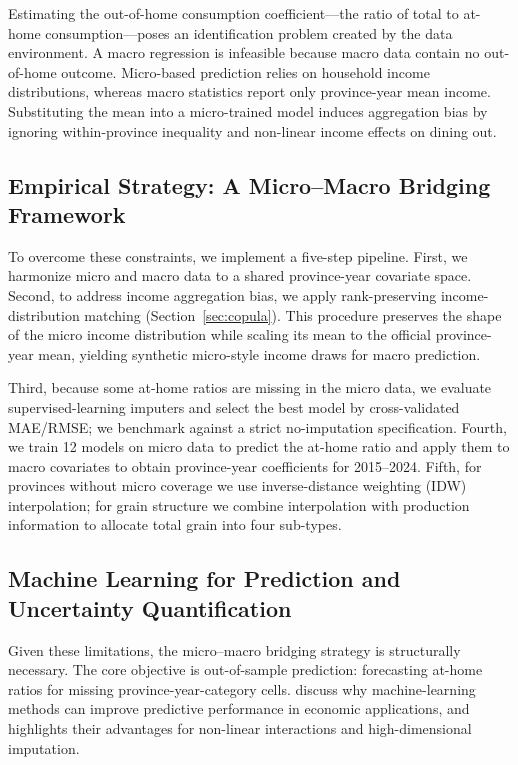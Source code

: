 \documentclass[12pt,a4paper]{article}
\begin{document}
Estimating the out-of-home consumption coefficient---the ratio of total to at-home consumption---poses an identification problem created by the data environment. A macro regression is infeasible because macro data contain no out-of-home outcome. Micro-based prediction relies on household income distributions, whereas macro statistics report only province-year mean income. Substituting the mean into a micro-trained model induces aggregation bias by ignoring within-province inequality and non-linear income effects on dining out.

\subsection{Empirical Strategy: A Micro--Macro Bridging Framework}
\label{subsec:bridge-framework}

To overcome these constraints, we implement a five-step pipeline. First, we harmonize micro and macro data to a shared province-year covariate space. Second, to address income aggregation bias, we apply rank-preserving income-distribution matching (Section~\ref{sec:copula}). This procedure preserves the shape of the micro income distribution while scaling its mean to the official province-year mean, yielding synthetic micro-style income draws for macro prediction.

Third, because some at-home ratios are missing in the micro data, we evaluate supervised-learning imputers and select the best model by cross-validated MAE/RMSE; we benchmark against a strict no-imputation specification. Fourth, we train 12 models on micro data to predict the at-home ratio and apply them to macro covariates to obtain province-year coefficients for 2015--2024. Fifth, for provinces without micro coverage we use inverse-distance weighting (IDW) interpolation; for grain structure we combine interpolation with production information to allocate total grain into four sub-types.

\subsection{Machine Learning for Prediction and Uncertainty Quantification}
\label{subsec:ml-justification}

Given these limitations, the micro--macro bridging strategy is structurally necessary. The core objective is out-of-sample prediction: forecasting at-home ratios for missing province-year-category cells. \citet{MullainathanSpiess2017} discuss why machine-learning methods can improve predictive performance in economic applications, and \citet{Athey2019} highlights their advantages for non-linear interactions and high-dimensional imputation.
\end{document}
